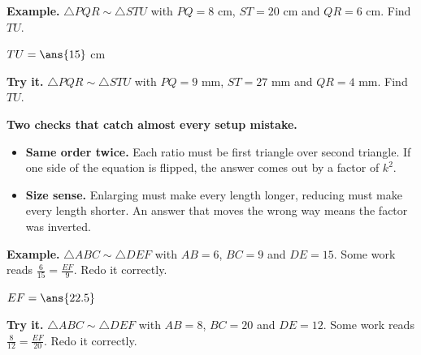 \documentclass[12pt]{article}
\begin{document}
\begin{examplebox}
\textbf{Example.} $\triangle PQR \sim \triangle STU$ with $PQ = 8$ cm,
$ST = 20$ cm and $QR = 6$ cm. Find $TU$.

$TU = \ans{15}$ cm
\end{examplebox}

\begin{tryitbox}
\textbf{Try it.} $\triangle PQR \sim \triangle STU$ with $PQ = 9$ mm,
$ST = 27$ mm and $QR = 4$ mm. Find $TU$.\\[2pt]
\end{tryitbox}


\begin{formulabox}
\textbf{Two checks that catch almost every setup mistake.}
\begin{itemize}[leftmargin=0.6cm, itemsep=1pt, topsep=2pt]
  \item \textbf{Same order twice.} Each ratio must be first triangle over second
        triangle. If one side of the equation is flipped, the answer comes out
        by a factor of $k^2$.
  \item \textbf{Size sense.} Enlarging must make every length longer, reducing
        must make every length shorter. An answer that moves the wrong way means
        the factor was inverted.
\end{itemize}
\end{formulabox}

\begin{examplebox}
\textbf{Example.} $\triangle ABC \sim \triangle DEF$ with $AB = 6$, $BC = 9$ and
$DE = 15$. Some work reads $\frac{6}{15} = \frac{EF}{9}$. Redo it correctly.

$EF = \ans{22.5}$
\end{examplebox}

\begin{tryitbox}
\textbf{Try it.} $\triangle ABC \sim \triangle DEF$ with $AB = 8$, $BC = 20$ and
$DE = 12$. Some work reads $\frac{8}{12} = \frac{EF}{20}$. Redo it
correctly.\\[2pt]
\end{tryitbox}
\end{document}
